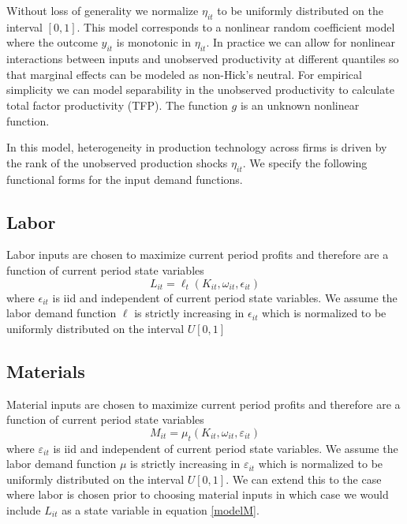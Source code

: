 \documentclass{article}
\begin{document}
Without loss of generality we normalize $\eta_{it}$ to be uniformly distributed on the interval $[0,1]$. This model corresponds to a nonlinear random coefficient model where the outcome $y_{it}$ is monotonic in $\eta_{it}$. In practice we can allow for nonlinear interactions between inputs and unobserved productivity at different quantiles so that marginal effects can be modeled as non-Hick's neutral. For empirical simplicity we can model separability in the unobserved productivity to calculate total factor productivity (TFP). The function $g$ is an unknown nonlinear function.

In this model, heterogeneity in production technology across firms is driven by the rank of the unobserved production shocks $\eta_{it}$. We specify the following functional forms for the input demand functions.

\subsection{Labor} 
Labor inputs are chosen to maximize current period profits and therefore are a function of current period state variables
\begin{equation} \label{modelL}
L_{it}=\ell_{t}(K_{it}, \omega_{it}, \epsilon_{it})
\end{equation}
where $\epsilon_{it}$ is iid and independent of current period state variables. We assume the labor demand function $\ell$ is strictly increasing in $\epsilon_{it}$ which is normalized to be uniformly distributed on the interval $U[0,1]$

\subsection{Materials} 
Material inputs are chosen to maximize current period profits and therefore are a function of current period state variables
\begin{equation} \label{modelM}
M_{it}=\mu_{t}(K_{it}, \omega_{it}, \varepsilon_{it})
\end{equation}
where $\varepsilon_{it}$ is iid and independent of current period state variables. We assume the labor demand function $\mu$ is strictly increasing in $\varepsilon_{it}$ which is normalized to be uniformly distributed on the interval $U[0,1]$. We can extend this to the case where labor is chosen prior to choosing material inputs in which case we would include $L_{it}$ as a state variable in equation \eqref{modelM}.
\end{document}
